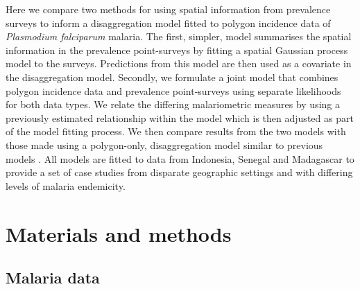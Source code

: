 \documentclass{statsoc}
\begin{document}


Here we compare two methods for using spatial information from prevalence surveys to inform a disaggregation model fitted to polygon incidence data of \emph{Plasmodium falciparum}  malaria.
The first, simpler, model summarises the spatial information in the prevalence point-surveys by fitting a spatial Gaussian process model to the surveys.
Predictions from this model are then used as a covariate in the disaggregation model.
Secondly, we formulate a joint model that combines polygon incidence data and prevalence point-surveys using separate likelihoods for both data types.
We relate the differing malariometric measures by using a previously estimated relationship within the model \citep{cameron2015defining} which is then adjusted as part of the model fitting process.
We then compare results from the two models with those made using a polygon-only, disaggregation model similar to previous models \citep{sturrock2014fine, wilson2017pointless}.
All models are fitted to data from Indonesia, Senegal and Madagascar to provide a set of case studies from disparate geographic settings and with differing levels of malaria endemicity.





\section*{Materials and methods}


\subsection*{Malaria data}
\end{document}
